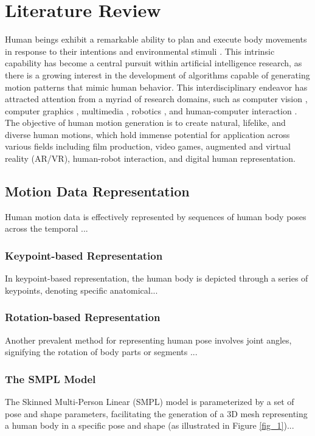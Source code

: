 %
%
%
%
%

\chapter{Literature Review}

Human beings exhibit a remarkable ability to plan and execute body movements in response to their intentions and environmental stimuli \cite{dummy}. This intrinsic capability has become a central pursuit within artificial intelligence research, as there is a growing interest in the development of algorithms capable of generating motion patterns that mimic human behavior. This interdisciplinary endeavor has attracted attention from a myriad of research domains, such as computer vision \cite{dummy}, computer graphics \cite{dummy}, multimedia \cite{dummy}, robotics \cite{dummy}, and human-computer interaction \cite{dummy}. The objective of human motion generation is to create natural, lifelike, and diverse human motions, which hold immense potential for application across various fields including film production, video games, augmented and virtual reality (AR/VR), human-robot interaction, and digital human representation.

\section{Motion Data Representation}
Human motion data is effectively represented by sequences of human body poses across the temporal ...

\subsection{Keypoint-based Representation}
In keypoint-based representation, the human body is depicted through a series of keypoints, denoting specific anatomical...

\subsection{Rotation-based Representation}
Another prevalent method for representing human pose involves joint angles, signifying the rotation of body parts or segments ...



\subsection{The SMPL Model}
The Skinned Multi-Person Linear (SMPL) model is parameterized by a set of pose and shape parameters, facilitating the generation of a 3D mesh representing a human body in a specific pose and shape (as illustrated in Figure \ref{fig_1})...





